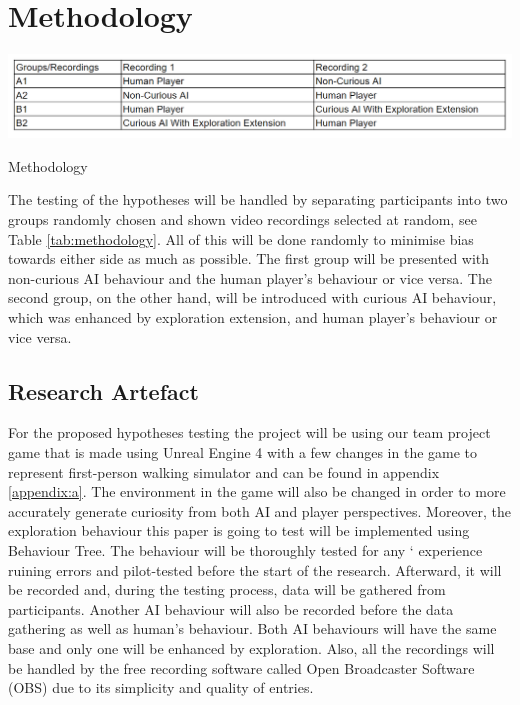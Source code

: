 \documentclass[journal]{IEEEtran}
\begin{document}
\section{Methodology}
\begin{table}
	\includegraphics[width=\linewidth]{MethodologyTable.PNG}
	\caption{Methodology}
	\label{tab:methodology}
\end{table}
The testing of the hypotheses will be handled by separating participants into two groups randomly chosen and shown video recordings selected at random, see Table \ref{tab:methodology}. All of this will be done randomly to minimise bias towards either side as much as possible. The first group will be presented with non-curious AI behaviour and the human player's behaviour or vice versa. The second group, on the other hand, will be introduced with curious AI behaviour, which was enhanced by exploration extension, and human player's behaviour or vice versa. %

\subsection{Research Artefact} %
For the proposed hypotheses testing the project will be using our team project game that is made using Unreal Engine 4 with a few changes in the game to represent first-person walking simulator and can be found in appendix \ref{appendix:a}. The environment in the game will also be changed in order to more accurately generate curiosity from both AI and player perspectives. Moreover, the exploration behaviour this paper is going to test will be implemented using Behaviour Tree. The behaviour will be thoroughly tested for any ` experience ruining errors and pilot-tested before the start of the research. Afterward, it will be recorded and, during the testing process, data will be gathered from participants. Another AI behaviour will also be recorded before the data gathering as well as human's behaviour. Both AI behaviours will have the same base and only one will be enhanced by exploration. Also, all the recordings will be handled by the free recording software called Open Broadcaster Software (OBS) due to its simplicity and quality of entries.
\end{document}
